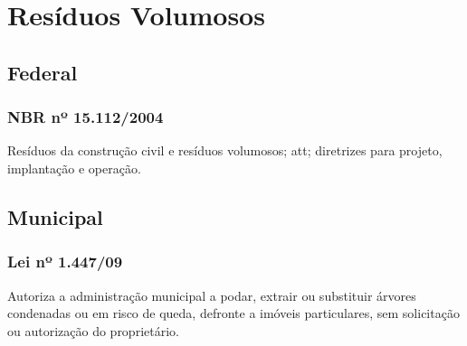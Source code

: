 \section{Resíduos Volumosos}
\begin{subapend}
	\subsection{Federal}
	\begin{subsubapend}
		\item \subsubsection{NBR nº 15.112/2004}
		Resíduos da construção civil e resíduos volumosos; \gls{att}; diretrizes para projeto, implantação e operação.
	\end{subsubapend}
\end{subapend}

\begin{subapend}
	\subsection{Municipal}
	\begin{subsubapend}
		\item \subsubsection{Lei nº 1.447/09}
		Autoriza a administração municipal a podar, extrair ou substituir árvores condenadas ou em risco de queda, defronte a imóveis particulares, sem solicitação ou autorização do proprietário.
	\end{subsubapend}
\end{subapend}



